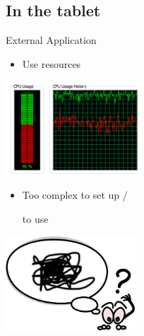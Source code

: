 \documentclass[a4paper,10pt]{beamer}
\begin{document}
		\subsection{In the tablet}
			
			\begin{frame}{External Application}
				\begin{multicols}{2}
					
					\begin{itemize}
						\item Use resources
					\end{itemize}
					\includegraphics[height=100pt]{images/network/CPU_resources.jpg}
					\pause
					\columnbreak	
					
					\begin{itemize}
						\item Too complex to set up /
						
						 to use
					\end{itemize}
					\includegraphics[height=100pt]{images/network/complex.png}					
				\end{multicols}	
			\end{frame}
		
\end{document}
